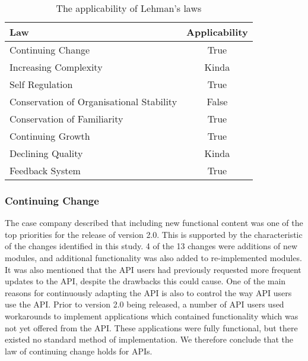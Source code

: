 \documentclass{sig-alternate}
\begin{document}
\begin{table}
       \centering
       \begin{tabular}[ht]{l|c}
              \toprule

              \textbf{Law}                              & \textbf{Applicability}    \\ \midrule
              Continuing Change                         & True                      \\ \hline
              Increasing Complexity                     & Kinda                     \\ \hline
              Self Regulation                           & True                      \\ \hline
              Conservation of Organisational Stability  & False                     \\ \hline
              Conservation of Familiarity               & True                      \\ \hline
              Continuing Growth                         & True                      \\ \hline
              Declining Quality                         & Kinda                     \\ \hline
              Feedback System                           & True                      \\ 

              \bottomrule

       \end{tabular}
       \caption{The applicability of Lehman's laws}
       \label{table:lehman}
\end{table}



\subsubsection{Continuing Change} %
The case company described that including new functional content was one of the top priorities for the release of version 2.0. This is supported by the characteristic of the changes identified in this study. 4 of the 13 changes were additions of new modules, and additional functionality was also added to re-implemented modules. It was also mentioned that the API users had previously requested more frequent updates to the API, despite the drawbacks this could cause. One of the main reasons for continuously adapting the API is also to control the way API users use the API. Prior to version 2.0 being released, a number of API users used workarounds to implement applications which contained functionality which was not yet offered from the API. These applications were fully functional, but there existed no standard method of implementation. We therefore conclude that the law of continuing change holds for APIs. 
\end{document}
